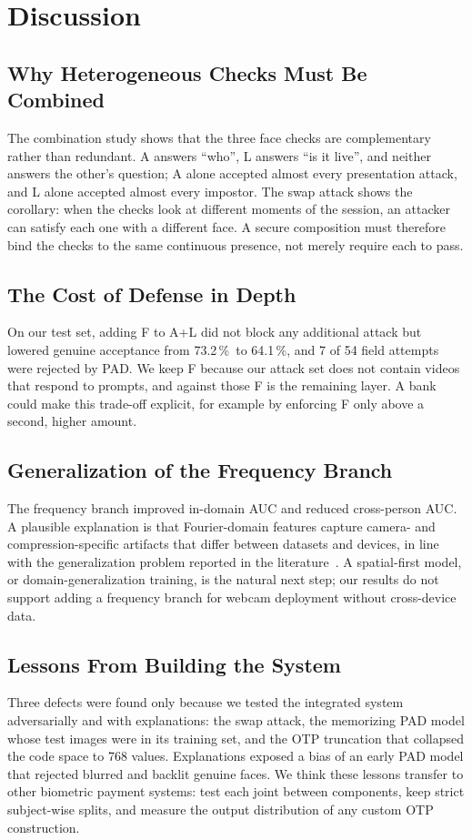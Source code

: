 \documentclass{ieeeaccess}
\newcommand{\pct}{\,\%}
\begin{document}
\section{Discussion}
\label{sec:discussion}

\subsection{Why Heterogeneous Checks Must Be Combined}
The combination study shows that the three face checks are complementary rather than redundant. A
answers ``who'', L answers ``is it live'', and neither answers the other's question; A alone accepted
almost every presentation attack, and L alone accepted almost every impostor. The swap attack shows the
corollary: when the checks look at different moments of the session, an attacker can satisfy each one
with a different face. A secure composition must therefore bind the checks to the same continuous
presence, not merely require each to pass.

\subsection{The Cost of Defense in Depth}
On our test set, adding F to A+L did not block any additional attack but lowered genuine acceptance from
73.2\pct\ to 64.1\pct, and 7 of 54 field attempts were rejected by PAD. We keep F because our attack set
does not contain videos that respond to prompts, and against those F is the remaining layer. A bank
could make this trade-off explicit, for example by enforcing F only above a second, higher amount.

\subsection{Generalization of the Frequency Branch}
The frequency branch improved in-domain AUC and reduced cross-person AUC. A plausible explanation is
that Fourier-domain features capture camera- and compression-specific artifacts that differ between
datasets and devices, in line with the generalization problem reported in the
literature~\cite{ssdg,fas_survey}. A spatial-first model, or domain-generalization training, is the
natural next step; our results do not support adding a frequency branch for webcam deployment without
cross-device data.

\subsection{Lessons From Building the System}
Three defects were found only because we tested the integrated system adversarially and with
explanations: the swap attack, the memorizing PAD model whose test images were in its training set, and
the OTP truncation that collapsed the code space to 768 values. Explanations exposed a bias of an early
PAD model that rejected blurred and backlit genuine faces. We think these lessons transfer to other
biometric payment systems: test each joint between components, keep strict subject-wise splits, and
measure the output distribution of any custom OTP construction.
\end{document}
